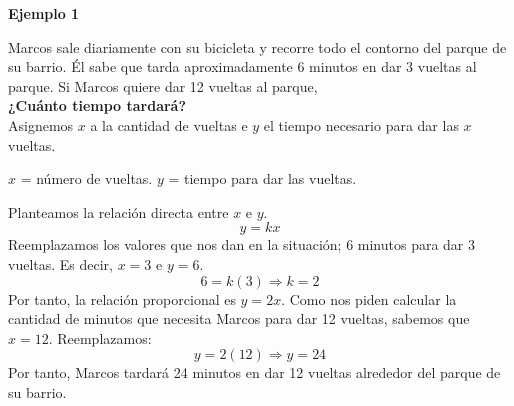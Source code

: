 {\color{brown}\textbf{Ejemplo 1}}

Marcos sale diariamente con su bicicleta y recorre todo el contorno del parque de su barrio.
Él sabe que tarda aproximadamente 6 minutos en dar 3 vueltas al parque.
Si Marcos quiere dar 12 vueltas al parque,\\
\textbf{¿Cuánto tiempo tardará?}\\
Asignemos $x$ a la cantidad de vueltas e $y$ el tiempo necesario para dar las $x$ vueltas.
\begin{center}
    $x$ = n\'umero de vueltas. \quad $y$ = tiempo para dar las vueltas.
\end{center}
Planteamos la relación directa entre $x$ e $y$.
\[y=kx\]
Reemplazamos los valores que nos dan en la situación; 6 minutos para dar 3 vueltas. Es decir, $x=3$ e $y=6$.
\[6=k(3) \Rightarrow k=2\]
Por tanto, la relación proporcional es $y=2x$.
Como nos piden calcular la cantidad de minutos que necesita Marcos para dar 12 vueltas, sabemos que $x=12$.
Reemplazamos:
\[y=2(12) \Rightarrow y=24\]
Por tanto, Marcos tardará 24 minutos en dar 12 vueltas alrededor del parque de su barrio.\\
